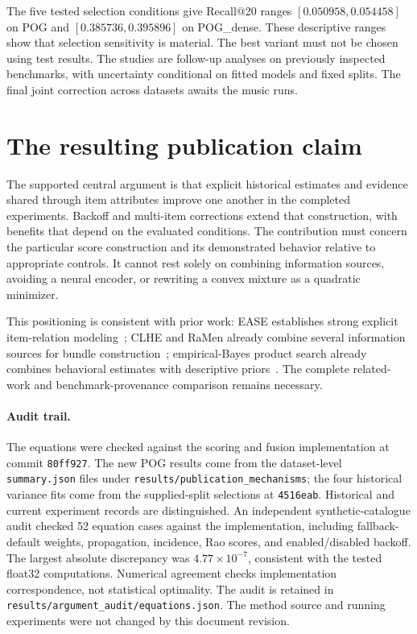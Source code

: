 \documentclass[11pt,a4paper]{article}
\begin{document}
The five tested selection conditions give Recall@20 ranges
$[0.050958,0.054458]$ on POG and $[0.385736,0.395896]$ on POG\_dense.
These descriptive ranges show that selection sensitivity is material. The best
variant must not be chosen using test results. The studies are follow-up analyses
on previously inspected benchmarks, with uncertainty conditional on fitted models
and fixed splits. The final joint correction across datasets awaits the music runs.

\section{The resulting publication claim}
The supported central argument is that explicit historical estimates and evidence
shared through item attributes improve one another in the completed experiments.
Backoff and multi-item corrections extend that construction, with benefits that
depend on the evaluated conditions. The contribution must concern the particular
score construction and its demonstrated behavior relative to appropriate controls.
It cannot rest solely on combining information sources, avoiding a neural encoder,
or rewriting a convex mixture as a quadratic minimizer.

This positioning is consistent with prior work: EASE establishes strong explicit
item-relation modeling~\cite{ease}; CLHE and RaMen already combine several information
sources for bundle construction~\cite{clhe,ramen}; empirical-Bayes product search
already combines behavioral estimates with descriptive priors~\cite{eb}.
The complete related-work and benchmark-provenance comparison remains necessary.

\paragraph{Audit trail.}
The equations were checked against the scoring and fusion implementation at commit
\texttt{80ff927}. The new POG results come from
the dataset-level \texttt{summary.json} files under
\texttt{results/publication\_mechanisms};
the four historical variance fits come from the supplied-split selections at
\texttt{4516eab}. Historical and current experiment records are distinguished.
An independent synthetic-catalogue audit checked 52 equation cases against the
implementation, including fallback-default weights, propagation, incidence, Rao
scores, and enabled/disabled backoff. The largest absolute discrepancy was
$4.77\times10^{-7}$, consistent with the tested float32 computations. Numerical
agreement checks implementation correspondence, not statistical optimality.
The audit is retained in \texttt{results/argument\_audit/equations.json}.
The method source and running experiments were not changed by this document revision.
\end{document}
